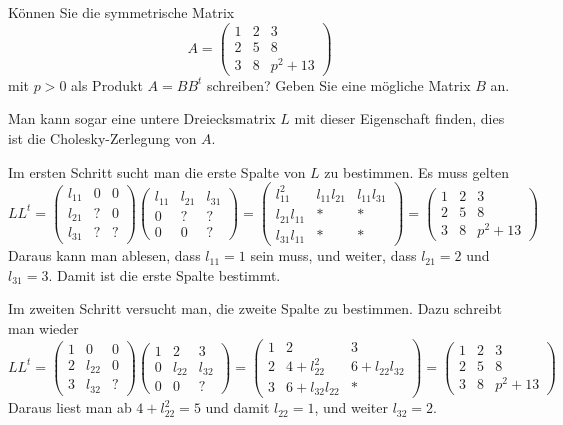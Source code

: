 Können Sie die symmetrische Matrix
\[
A=\begin{pmatrix}
 1&2&3\\
 2&5&8\\
 3&8&p^2 + 13
\end{pmatrix}
\]
mit $p>0$ als Produkt $A=BB^t$ schreiben?
Geben Sie eine mögliche Matrix $B$ an.


\begin{loesung}
Man kann sogar eine untere Dreiecksmatrix $L$ mit dieser Eigenschaft finden,
dies ist die Cholesky-Zerlegung von $A$.

Im ersten Schritt sucht man die erste Spalte von $L$ zu bestimmen.
Es muss gelten
\[
LL^t=
\begin{pmatrix}
l_{11}&  0&  0\\
l_{21}&  ?&  0\\
l_{31}&  ?&  ?
\end{pmatrix}
\begin{pmatrix}
l_{11}&l_{21}&l_{31}\\
     0&     ?&     ?\\
     0&     0&     ?
\end{pmatrix}
=
\begin{pmatrix}
    l_{11}^2&l_{11}l_{21}&l_{11}l_{31}\\
l_{21}l_{11}&           *&           *\\
l_{31}l_{11}&           *&           *
\end{pmatrix}
=
\begin{pmatrix}
 1&2&3\\
 2&5&8\\
 3&8&p^2 + 13
\end{pmatrix}
\]
Daraus kann man ablesen, dass $l_{11}=1$ sein muss, und weiter,
dass
$l_{21}=2$ und $l_{31}=3$. Damit ist die erste Spalte bestimmt.

Im zweiten Schritt versucht man, die zweite Spalte zu bestimmen.
Dazu schreibt man wieder
\[
LL^t
=
\begin{pmatrix}
1&     0&0\\
2&l_{22}&0\\
3&l_{32}&?
\end{pmatrix}
\begin{pmatrix}
1&     2&     3\\
0&l_{22}&l_{32}\\
0&     0&?
\end{pmatrix}
=
\begin{pmatrix}
 1&              2&             3\\
 2& 4+l_{22}^2    & 6+l_{22}l_{32}\\
 3& 6+l_{32}l_{22}&             *
\end{pmatrix}
=
\begin{pmatrix}
 1&2&3\\
 2&5&8\\
 3&8&p^2 + 13
\end{pmatrix}
\]
Daraus liest man ab $4+l_{22}^2=5$ und damit $l_{22}=1$, und weiter
$l_{32}=2$.


\end{loesung}
